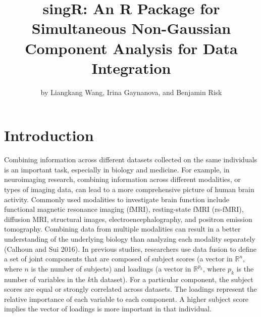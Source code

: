 \title{singR: An R Package for Simultaneous Non-Gaussian Component Analysis for Data Integration}


\author{by Liangkang Wang, Irina Gaynanova, and Benjamin Risk}

\maketitle


\hypertarget{introduction}{%
\section{Introduction}\label{introduction}}

Combining information across different datasets collected on the same individuals is an important task, especially in biology and medicine. For example, in neuroimaging research, combining information across different modalities, or types of imaging data, can lead to a more comprehensive picture of human brain activity. Commonly used modalities to investigate brain function include functional magnetic resonance imaging (fMRI), resting-state fMRI (rs-fMRI), diffusion MRI, structural images, electroencephalography, and positron emission tomography. Combining data from multiple modalities can result in a better understanding of the underlying biology than analyzing each modality separately (Calhoun and Sui 2016). In previous studies, researchers use data fusion to define a set of joint components that are composed of subject scores (a vector in \(\mathbb{R}^n\), where \(n\) is the number of subjects) and loadings (a vector in \(\mathbb{R}^{p_k}\), where \(p_k\) is the number of variables in the \(k\)th dataset). For a particular component, the subject scores are equal or strongly correlated across datasets. The loadings represent the relative importance of each variable to each component. A higher subject score implies the vector of loadings is more important in that individual.

